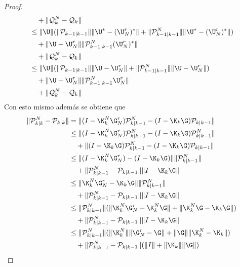 \begin{proof}
\begin{equation*}
\begin{aligned}
			 & \quad + \|  \mathcal{Q}_k^N -  \mathcal{Q}_k \| \\
			 & \leq \| \U \| ( \| \mathcal{P}_{k-1|k-1} \| \| \U^* - (\U_N^r)^* \| + \| \mathcal{P}_{k-1|k-1} ^N \|  \| \U^* - (\U_N^r)^*  \| ) \\
			 & \quad + \|  \U  - \U_N^r \|  \|  \mathcal{P}_{k-1|k-1}^N (\U_N^r)^* \| \\
			 & \quad + \|  \mathcal{Q}_k^N -  \mathcal{Q}_k \| \\
			 & \leq \| \U \| ( \| \mathcal{P}_{k-1|k-1} \| \| \U - \U_N^r \| + \| \mathcal{P}_{k-1|k-1} ^N \|  \| \U - \U_N^r  \| ) \\
			 & \quad + \|  \U  - \U_N^r \|  \|  \mathcal{P}_{k-1|k-1}^N \U_N^r \| \\
			 & \quad + \|  \mathcal{Q}_k^N -  \mathcal{Q}_k \| \\
		\end{aligned}
	\end{equation*}
	Con esto mismo además se obtiene que
	\begin{equation*}
		\begin{aligned}
			\| \mathcal{P}_{k|k}^N  -  \mathcal{P}_{k|k} \| & = \| (I - \K_k^N \G_N^r) \mathcal{P}_{k|k-1}^N - (I - \K_k \G) \mathcal{P}_{k|k-1} \| \\
			& \leq \| (I - \K_k^N \G_N^r) \mathcal{P}_{k|k-1}^N - (I - \K_k \G) \mathcal{P}_{k|k-1}^N \| \\
			& \quad + \|  (I - \K_k \G) \mathcal{P}_{k|k-1}^N - (I - \K_k \G) \mathcal{P}_{k|k-1} \| \\
			& \leq \| (I - \K_k^N \G_N^r) - (I - \K_k \G)  \| \| \mathcal{P}_{k|k-1}^N \| \\
			& \quad + \|  \mathcal{P}_{k|k-1}^N - \mathcal{P}_{k|k-1} \| \| I - \K_k \G \| \\
			& \leq \|  \K_k^N \G_N^r - \K_k \G  \| \| \mathcal{P}_{k|k-1}^N \| \\
			& \quad + \|  \mathcal{P}_{k|k-1}^N - \mathcal{P}_{k|k-1} \| \| I - \K_k \G \| \\
			& \leq \| \mathcal{P}_{k|k-1}^N \| ( \|  \K_k^N \G_N^r - \K_k^N \G  \| + \| \K_k^N \G - \K_k \G \| ) \\
			& \quad + \|  \mathcal{P}_{k|k-1}^N - \mathcal{P}_{k|k-1} \| \| I - \K_k \G \| \\ 
			& \leq \| \mathcal{P}_{k|k-1}^N \| ( \| \K_k^N \| \| \G_N^r - \G  \| + \| \G \| \| \K_k^N  - \K_k \| ) \\
			& \quad + \|  \mathcal{P}_{k|k-1}^N - \mathcal{P}_{k|k-1} \| ( \| I \| + \| \K_k \| \| \G \| )\\ 

\end{aligned}
\end{equation*}
\end{proof}
